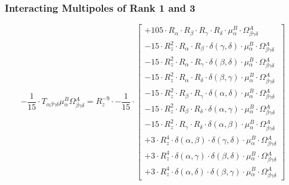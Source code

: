 \documentclass{article}
\begin{document}
\subsubsection{Interacting Multipoles of Rank 1 and 3}
\begin{equation}
- \frac{1}{15} \cdot T_{\alpha{}\beta{}\gamma{}\delta{}} \mu{}^{B}_{\alpha{}} \Omega{}^{A}_{\beta{}\gamma{}\delta{}} = R_{z}^{-9} \cdot - \frac{1}{15} \cdot  \left[ \begin{array}{c} 
 		+ 105 \cdot R_{\alpha{}} \cdot R_{\beta{}} \cdot R_{\gamma{}} \cdot R_{\delta{}} \cdot \mu{}^{B}_{\alpha{}} \cdot \Omega{}^{A}_{\beta{}\gamma{}\delta{}} 
 \\[0.2em] 		 - 15 \cdot R_{z}^{2} \cdot R_{\alpha{}} \cdot R_{\beta{}} \cdot \delta{}\left(\gamma{}, \delta{}\right) \cdot \mu{}^{B}_{\alpha{}} \cdot \Omega{}^{A}_{\beta{}\gamma{}\delta{}} 
 \\[0.2em] 		 - 15 \cdot R_{z}^{2} \cdot R_{\alpha{}} \cdot R_{\gamma{}} \cdot \delta{}\left(\beta{}, \delta{}\right) \cdot \mu{}^{B}_{\alpha{}} \cdot \Omega{}^{A}_{\beta{}\gamma{}\delta{}} 
 \\[0.2em] 		 - 15 \cdot R_{z}^{2} \cdot R_{\alpha{}} \cdot R_{\delta{}} \cdot \delta{}\left(\beta{}, \gamma{}\right) \cdot \mu{}^{B}_{\alpha{}} \cdot \Omega{}^{A}_{\beta{}\gamma{}\delta{}} 
 \\[0.2em] 		 - 15 \cdot R_{z}^{2} \cdot R_{\beta{}} \cdot R_{\gamma{}} \cdot \delta{}\left(\alpha{}, \delta{}\right) \cdot \mu{}^{B}_{\alpha{}} \cdot \Omega{}^{A}_{\beta{}\gamma{}\delta{}} 
 \\[0.2em] 		 - 15 \cdot R_{z}^{2} \cdot R_{\beta{}} \cdot R_{\delta{}} \cdot \delta{}\left(\alpha{}, \gamma{}\right) \cdot \mu{}^{B}_{\alpha{}} \cdot \Omega{}^{A}_{\beta{}\gamma{}\delta{}} 
 \\[0.2em] 		 - 15 \cdot R_{z}^{2} \cdot R_{\gamma{}} \cdot R_{\delta{}} \cdot \delta{}\left(\alpha{}, \beta{}\right) \cdot \mu{}^{B}_{\alpha{}} \cdot \Omega{}^{A}_{\beta{}\gamma{}\delta{}} 
 \\[0.2em] 		 + 3 \cdot R_{z}^{4} \cdot \delta{}\left(\alpha{}, \beta{}\right) \cdot \delta{}\left(\gamma{}, \delta{}\right) \cdot \mu{}^{B}_{\alpha{}} \cdot \Omega{}^{A}_{\beta{}\gamma{}\delta{}} 
 \\[0.2em] 		 + 3 \cdot R_{z}^{4} \cdot \delta{}\left(\alpha{}, \gamma{}\right) \cdot \delta{}\left(\beta{}, \delta{}\right) \cdot \mu{}^{B}_{\alpha{}} \cdot \Omega{}^{A}_{\beta{}\gamma{}\delta{}} 
 \\[0.2em] 		 + 3 \cdot R_{z}^{4} \cdot \delta{}\left(\alpha{}, \delta{}\right) \cdot \delta{}\left(\beta{}, \gamma{}\right) \cdot \mu{}^{B}_{\alpha{}} \cdot \Omega{}^{A}_{\beta{}\gamma{}\delta{}}
 \end{array}\right] 
\end{equation}
\end{document}
